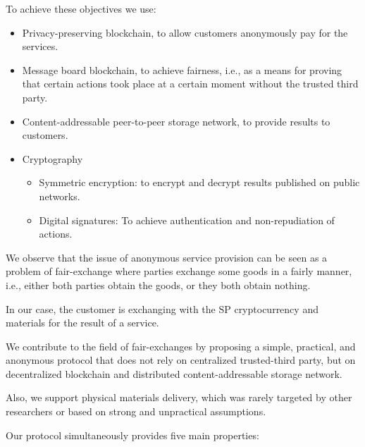 \documentclass{ieeeaccess}
\begin{document}
To achieve these objectives we use:
\begin{itemize}
    \item Privacy-preserving blockchain, to allow customers anonymously pay for the services.
    \item Message board blockchain, to achieve fairness, i.e., as a means for proving that certain actions took place at a certain moment without the trusted third party.
    \item Content-addressable peer-to-peer storage network, to provide results to customers. 
    \item Cryptography
    \begin{itemize}
        \item Symmetric encryption: to encrypt and decrypt results published on public networks.
        \item Digital signatures: To achieve authentication and non-repudiation of actions. 
    \end{itemize}
    
\end{itemize}

We observe that the issue of anonymous service provision can be seen as a problem of fair-exchange where parties exchange some goods in a fairly manner, i.e., either both parties obtain the goods, or they both obtain nothing.

In our case, the customer is exchanging with the SP cryptocurrency and materials for the result of a service.

We contribute to the field of fair-exchanges by proposing a simple,
 practical, and anonymous protocol that does not rely on centralized trusted-third party, but on decentralized blockchain and
distributed content-addressable storage network.

Also, we support physical materials delivery, which was rarely targeted by other researchers or based on strong and unpractical assumptions.

Our protocol simultaneously provides five main properties:
\end{document}
